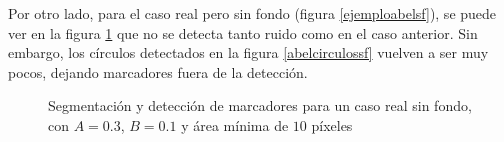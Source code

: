 Por otro lado, para el caso real pero sin fondo (figura \ref{ejemploabelsf}), se puede ver en la figura \ref{ejemploabel} que no se detecta tanto ruido como en el caso anterior. Sin embargo, los círculos detectados en la figura \ref{abelcirculossf} vuelven a ser muy pocos, dejando marcadores fuera de la detección.

\begin{figure}[H]
        \centering
        \hspace{5 mm}
  \caption{Segmentación y detección de marcadores para un caso real sin fondo, con $A=0.3$, $B=0.1$ y área mínima de $10$ píxeles}
      \label{ejemploabel}
\end{figure}

